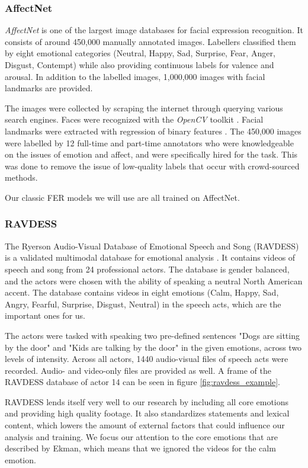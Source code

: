 \subsubsection{AffectNet}
\emph{AffectNet} \cite{mollahosseini2017affectnet} is one of the largest image databases for facial expression recognition. It consists of around 450,000 manually annotated images. Labellers classified them by eight emotional categories (Neutral, Happy, Sad, Surprise, Fear, Anger, Disgust, Contempt) while also providing continuous labels for valence and arousal. In addition to the labelled images, 1,000,000 images with facial landmarks are provided.

The images were collected by scraping the internet through querying various search engines. Faces were recognized with the \emph{OpenCV} toolkit \cite{opencv_library}. Facial landmarks were extracted with regression of binary features \cite{ren2014face}. The 450,000 images were labelled by 12 full-time and part-time annotators who were knowledgeable on the issues of emotion and affect, and were specifically hired for the task. This was done to remove the issue of low-quality labels that occur with crowd-sourced methods. \cite{mollahosseini2017affectnet}

Our classic FER models we will use are all trained on AffectNet.

\subsubsection{RAVDESS}
\label{sub:ravdess}
The Ryerson Audio-Visual Database of Emotional Speech and Song (RAVDESS) is a validated multimodal database for emotional analysis \cite{livingstone2018ryerson}. It contains videos of speech and song from 24 professional actors. The database is gender balanced, and the actors were chosen with the ability of speaking a neutral North American accent. The database contains videos in eight emotions (Calm, Happy, Sad, Angry, Fearful, Surprise, Disgust, Neutral) in the speech acts, which are the important ones for us.

The actors were tasked with speaking two pre-defined sentences "Dogs are sitting by the door" and "Kids are talking by the door" in the given emotions, across two levels of intensity. Across all actors, 1440 audio-visual files of speech acts were recorded. Audio- and video-only files are provided as well. A frame of the RAVDESS database of actor 14 can be seen in figure \ref{fig:ravdess_example}.

RAVDESS lends itself very well to our research by including all core emotions and providing high quality footage. It also standardizes statements and lexical content, which lowers the amount of external factors that could influence our analysis and training. We focus our attention to the core emotions that are described by Ekman, which means that we ignored the videos for the calm emotion.

